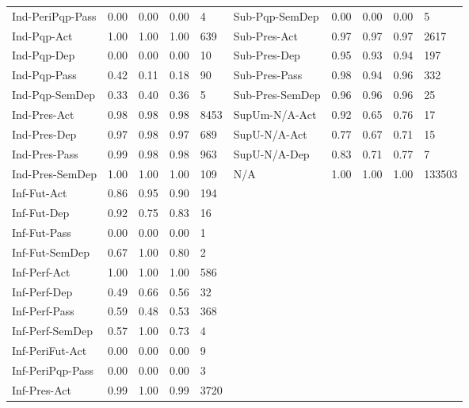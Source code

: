 \begin{table}[h]
{\begin{tabular}{@{}l|llll||l|llll@{}}
 Ind-PeriPqp-Pass  & 0.00      & 0.00   & 0.00     & 4       & Sub-Pqp-SemDep    & 0.00      & 0.00   & 0.00     & 5       \\ 
 Ind-Pqp-Act       & 1.00      & 1.00   & 1.00     & 639     & Sub-Pres-Act      & 0.97      & 0.97   & 0.97     & 2617    \\ 
 Ind-Pqp-Dep       & 0.00      & 0.00   & 0.00     & 10      & Sub-Pres-Dep      & 0.95      & 0.93   & 0.94     & 197     \\ 
 Ind-Pqp-Pass      & 0.42      & 0.11   & 0.18     & 90      & Sub-Pres-Pass     & 0.98      & 0.94   & 0.96     & 332     \\ 
 Ind-Pqp-SemDep    & 0.33      & 0.40   & 0.36     & 5       & Sub-Pres-SemDep   & 0.96      & 0.96   & 0.96     & 25      \\ 
 Ind-Pres-Act      & 0.98      & 0.98   & 0.98     & 8453    & SupUm-N/A-Act       & 0.92      & 0.65   & 0.76     & 17      \\ 
 Ind-Pres-Dep      & 0.97      & 0.98   & 0.97     & 689     & SupU-N/A-Act        & 0.77      & 0.67   & 0.71     & 15      \\ 
 Ind-Pres-Pass     & 0.99      & 0.98   & 0.98     & 963     & SupU-N/A-Dep        & 0.83      & 0.71   & 0.77     & 7       \\ 
 Ind-Pres-SemDep   & 1.00      & 1.00   & 1.00     & 109     & N/A               & 1.00      & 1.00   & 1.00     & 133503  \\ 
 Inf-Fut-Act       & 0.86      & 0.95   & 0.90     & 194     \\ 
 Inf-Fut-Dep       & 0.92      & 0.75   & 0.83     & 16      \\ 
 Inf-Fut-Pass      & 0.00      & 0.00   & 0.00     & 1       \\ 
 Inf-Fut-SemDep    & 0.67      & 1.00   & 0.80     & 2       \\ 
 Inf-Perf-Act      & 1.00      & 1.00   & 1.00     & 586     \\ 
 Inf-Perf-Dep      & 0.49      & 0.66   & 0.56     & 32      \\ 
 Inf-Perf-Pass     & 0.59      & 0.48   & 0.53     & 368     \\ 
 Inf-Perf-SemDep   & 0.57      & 1.00   & 0.73     & 4       \\ 
 Inf-PeriFut-Act   & 0.00      & 0.00   & 0.00     & 9       \\ 
 Inf-PeriPqp-Pass  & 0.00      & 0.00   & 0.00     & 3       \\ 
 Inf-Pres-Act      & 0.99      & 1.00   & 0.99     & 3720    \\ 

\end{tabular}}
\end{table}
